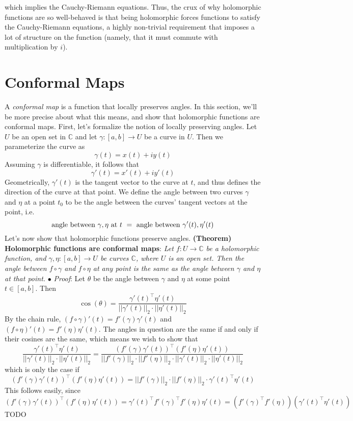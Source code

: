 \documentclass{article}
\newcommand*{\tb}{\textbf}
\newcommand*{\ti}{\textit}
\newcommand*{\n}{\newline}
\newcommand*{\nn}{\newline \newline}
\newcommand*{\Pf}{\indent \ensuremath{\bullet} \textit{Proof}: }
\newcommand*{\C}{\mathbb{C}}
\begin{document}
which implies the Cauchy-Riemann equations. Thus, the crux of why holomorphic functions are so well-behaved is that being holomorphic forces functions to satisfy the Cauchy-Riemann equations, a highly non-trivial requirement that imposes a lot of structure on the function (namely, that it must commute with multiplication by $ i $).

\section{Conformal Maps}
A \ti{conformal map} is a function that locally preserves angles. In this section, we'll be more precise about what this means, and show that holomorphic functions are conformal maps. First, let's formalize the notion of locally preserving angles. Let $ U $ be an open set in $ \C $ and let $ \gamma: [a, b] \rightarrow U $ be a curve in $ U $. Then we parameterize the curve as
$$ \gamma(t) = x(t) + i y(t) $$
Assuming $ \gamma $ is differentiable, it follows that
$$ \gamma'(t) = x'(t) + i y'(t) $$
Geometrically, $ \gamma'(t) $ is the tangent vector to the curve at $ t $, and thus defines the direction of the curve at that point. We define the angle between two curves $ \gamma $ and $ \eta $ at a point $ t_0 $ to be the angle between the curves' tangent vectors at the point, i.e.
$$ \text{ angle between $ \gamma, \eta $ at $ t $ } = \text{ angle between $ \gamma'(t), \eta'(t) $ } $$
Let's now show that holomorphic functions preserve angles.
\nn
\tb{(Theorem) Holomorphic functions are conformal maps}: \ti{Let $ f: U \rightarrow \C $ be a holomorphic function, and $ \gamma, \eta: [a, b] \rightarrow U $ be curves $ \C $, where $ U $ is an open set. Then the angle between $ f \circ \gamma $ and $ f \circ \eta $ at any point is the same as the angle between $ \gamma $ and $ \eta $ at that point.}
\n
\Pf Let $ \theta $ be the angle between $ \gamma $ and $ \eta $ at some point $ t \in [ a, b ] $. Then
$$ \cos(\theta) = \frac{\gamma'(t)^\intercal \eta'(t)}{|| \gamma'(t) ||_2 \cdot || \eta'(t) ||_2} $$
By the chain rule, $ (f \circ \gamma)'(t) = f'(\gamma) \gamma'(t) $ and $ (f \circ \eta)'(t) = f'(\eta) \eta'(t) $. The angles in question are the same if and only if their cosines are the same, which means we wish to show that
$$ \frac{\gamma'(t)^\intercal \eta'(t)}{|| \gamma'(t) ||_2 \cdot || \eta'(t) ||_2} = \frac{(f'(\gamma) \gamma'(t))^\intercal (f'(\eta) \eta'(t))}{|| f'(\gamma) ||_2 \cdot || f'(\eta) ||_2 \cdot || \gamma'(t) ||_2 \cdot || \eta'(t) ||_2} $$
which is only the case if
$$ (f'(\gamma) \gamma'(t))^\intercal (f'(\eta) \eta'(t)) = || f'(\gamma) ||_2 \cdot || f'(\eta) ||_2 \cdot \gamma'(t)^\intercal \eta'(t) $$
This follows easily, since
$$ (f'(\gamma) \gamma'(t))^\intercal (f'(\eta) \eta'(t)) = \gamma'(t)^\intercal f'(\gamma)^\intercal f'(\eta) \eta'(t) = (f'(\gamma)^\intercal f'(\eta))(\gamma'(t)^\intercal \eta'(t)) $$
TODO
\end{document}
